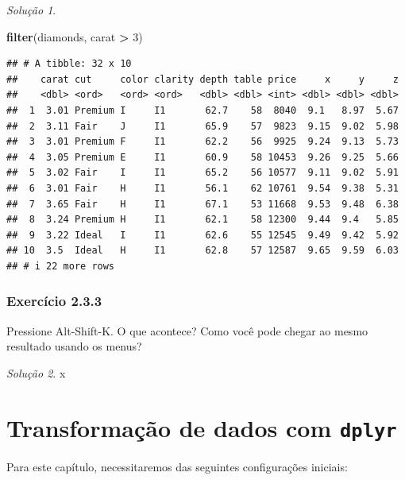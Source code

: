 \documentclass[
]{latex/krantz}
\newenvironment{Shaded}{\begin{snugshade}}{\end{snugshade}}
\newcommand{\DecValTok}[1]{\textcolor[rgb]{0.00,0.00,0.81}{#1}}
\newcommand{\FunctionTok}[1]{\textcolor[rgb]{0.13,0.29,0.53}{\textbf{#1}}}
\newcommand{\NormalTok}[1]{#1}
\newcommand{\SpecialCharTok}[1]{\textcolor[rgb]{0.81,0.36,0.00}{\textbf{#1}}}
\theoremstyle{definition}
\theoremstyle{definition}
\theoremstyle{definition}
\theoremstyle{definition}
\theoremstyle{remark}
\newtheorem*{solution}{Solução}
\begin{document}
\begin{solution}
\begin{Shaded}
\begin{Highlighting}[]
\FunctionTok{filter}\NormalTok{(diamonds, carat }\SpecialCharTok{\textgreater{}} \DecValTok{3}\NormalTok{)}
\end{Highlighting}
\end{Shaded}

\begin{verbatim}
## # A tibble: 32 x 10
##    carat cut     color clarity depth table price     x     y     z
##    <dbl> <ord>   <ord> <ord>   <dbl> <dbl> <int> <dbl> <dbl> <dbl>
##  1  3.01 Premium I     I1       62.7    58  8040  9.1   8.97  5.67
##  2  3.11 Fair    J     I1       65.9    57  9823  9.15  9.02  5.98
##  3  3.01 Premium F     I1       62.2    56  9925  9.24  9.13  5.73
##  4  3.05 Premium E     I1       60.9    58 10453  9.26  9.25  5.66
##  5  3.02 Fair    I     I1       65.2    56 10577  9.11  9.02  5.91
##  6  3.01 Fair    H     I1       56.1    62 10761  9.54  9.38  5.31
##  7  3.65 Fair    H     I1       67.1    53 11668  9.53  9.48  6.38
##  8  3.24 Premium H     I1       62.1    58 12300  9.44  9.4   5.85
##  9  3.22 Ideal   I     I1       62.6    55 12545  9.49  9.42  5.92
## 10  3.5  Ideal   H     I1       62.8    57 12587  9.65  9.59  6.03
## # i 22 more rows
\end{verbatim}

\end{solution}

\hypertarget{exr2-3-3}{%
\subsection*{Exercício 2.3.3}\label{exr2-3-3}}

Pressione Alt-Shift-K. O que acontece? Como você pode chegar ao mesmo resultado usando os menus?

\begin{solution}
x
\end{solution}

\hypertarget{transformauxe7uxe3o-de-dados-com-dplyr}{%
\chapter{\texorpdfstring{Transformação de dados com \texttt{dplyr}}{Transformação de dados com dplyr}}\label{transformauxe7uxe3o-de-dados-com-dplyr}}

Para este capítulo, necessitaremos das seguintes configurações iniciais:
\end{document}
